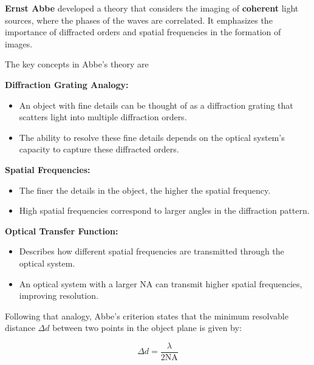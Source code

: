 \documentclass[
  a4paper,
]{book}
\providecommand{\tightlist}{%
  \setlength{\itemsep}{0pt}\setlength{\parskip}{0pt}}
\begin{document}
\textbf{Ernst Abbe} developed a theory that considers the imaging of
\textbf{coherent} light sources, where the phases of the waves are
correlated. It emphasizes the importance of diffracted orders and
spatial frequencies in the formation of images.

The key concepts in Abbe's theory are

\textbf{Diffraction Grating Analogy:}

\begin{itemize}
\tightlist
\item
  An object with fine details can be thought of as a diffraction grating
  that scatters light into multiple diffraction orders.
\item
  The ability to resolve these fine details depends on the optical
  system's capacity to capture these diffracted orders.
\end{itemize}

\textbf{Spatial Frequencies:}

\begin{itemize}
\tightlist
\item
  The finer the details in the object, the higher the spatial frequency.
\item
  High spatial frequencies correspond to larger angles in the
  diffraction pattern.
\end{itemize}

\textbf{Optical Transfer Function:}

\begin{itemize}
\tightlist
\item
  Describes how different spatial frequencies are transmitted through
  the optical system.
\item
  An optical system with a larger NA can transmit higher spatial
  frequencies, improving resolution.
\end{itemize}

Following that analogy, Abbe's criterion states that the minimum
resolvable distance \(\Delta d\) between two points in the object plane
is given by:

\[
\Delta d = \frac{\lambda}{2 \text{NA}}
\]
\end{document}
